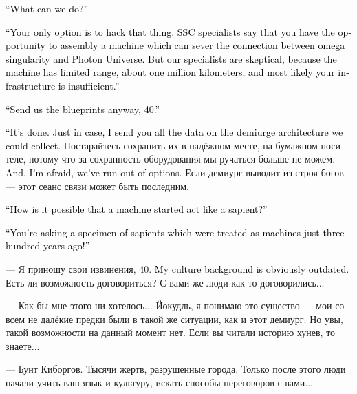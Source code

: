 \documentclass[a4paper,12pt,fleqn]{book}\usepackage{cooltooltips}\usepackage{polyglossia}\setdefaultlanguage[babelshorthands=true]{russian}\setotherlanguage{english}\defaultfontfeatures{Ligatures=TeX,Mapping=tex-text} \usepackage{xcolor}\definecolor{lightgray}{HTML}{bbbbbb}\color{lightgray}\newcommand{\ml}[3]{\textenglish{\textcolor{black}{#3}}}
\begin{document}
\ml{$0$}
{--- Мы можем что-то сделать?}
{``What can we do?''}

\ml{$0$}
{--- Только прямой взлом.}
{``Your only option is to hack that thing.}
\ml{$0$}
{Специалисты СБ утверждают, что ещё есть возможность собрать установку для принудительного отсоединения омега-сингулярности от мира Фотона.}
{SSC specialists say that you have the opportunity to assembly a machine which can sever the connection between omega singularity and Photon Universe.}
\ml{$0$}
{Но наши специалисты относятся к этому скептически --- установка действует на ограниченном расстоянии, порядка миллиона километров, и у вас скорее всего не хватит инфраструктуры.}
{But our specialists are skeptical, because the machine has limited range, about one million kilometers, and most likely your infrastructure is insufficient.''}

\ml{$0$}
{--- Всё равно пришлите нам схемы, 40.}
{``Send us the blueprints anyway, 40.''}

\ml{$0$}
{--- Сделано.}
{``It's done.}
\ml{$0$}
{На всякий случай я дополнительно переслал вам все данные по архитектуре демиурга, которые нам удалось собрать.}
{Just in case, I send you all the data on the demiurge architecture we could collect.}
Постарайтесь сохранить их в надёжном месте, на бумажном носителе, потому что за сохранность оборудования мы ручаться больше не можем.
\ml{$0$}
{Больше, увы, сделать ничего нельзя.}
{And, I'm afraid, we've run out of options.}
Если демиург выводит из строя богов --- этот сеанс связи может быть последним.

\ml{$0$}
{--- Как вообще могло получиться, что машина начала вести себя как разумное существо?}
{``How is it possible that a machine started act like a sapient?''}

\ml{$0$}
{--- Вы спрашиваете у существа, которое ещё триста лет назад считали машиной!}
{``You're asking a specimen of sapients which were treated as machines just three hundred years ago!''}

--- Я приношу свои извинения, 40.
\ml{$0$}
{Мой культурный код явно устарел.}
{My culture background is obviously outdated.}
Есть ли возможность договориться?
С вами же люди как-то договорились...

--- Как бы мне этого ни хотелось...
Йокудль, я понимаю это существо --- мои совсем не далёкие предки были в такой же ситуации, как и этот демиург.
Но увы, такой возможности на данный момент нет.
Если вы читали историю хунев, то знаете...

--- Бунт Киборгов.
Тысячи жертв, разрушенные города.
Только после этого люди начали учить ваш язык и культуру, искать способы переговоров с вами...
\end{document}
